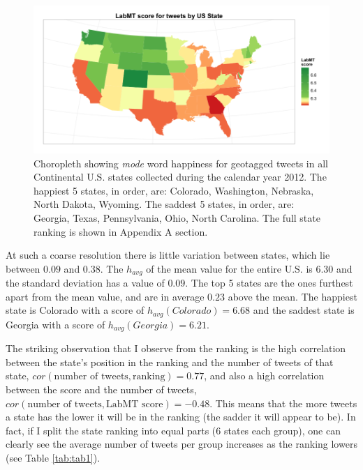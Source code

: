 \documentclass{llncs}
\begin{document}
\begin{figure}
\centering
\includegraphics[width=\textwidth]{images/scores_by_state}
\caption{Choropleth showing \emph{mode} word happiness for geotagged tweets in all Continental U.S. states collected during the calendar year 2012. The happiest 5 states, in order, are: Colorado, Washington, Nebraska, North Dakota, Wyoming. The saddest 5 states, in order, are: Georgia, Texas, Pennsylvania, Ohio, North Carolina. The full state ranking is shown in Appendix A section.}
\label{fig:scores_by_state}
\end{figure}
\FloatBarrier

At such a coarse resolution there is little variation between states, which lie between $0.09$ and $0.38$. The $h_{avg}$ of the mean value for the entire U.S. is $6.30$ and the standard deviation has a value of $0.09$. The top 5 states are the ones furthest apart from the mean value, and are in average $0.23$ above the mean. The happiest state is Colorado with a score of $h_{avg}(Colorado) = 6.68$ and the saddest state is Georgia with a score of $h_{avg}(Georgia) = 6.21$.

The striking observation that I observe from the ranking is the high correlation between the state's position in the ranking and the number of tweets of that state, $cor(\textrm{number of tweets}, \textrm{ranking}) = 0.77$, and also a high correlation between the score and the number of tweets, $cor(\textrm{number of tweets}, \textrm{LabMT score}) = -0.48$. This means that the more tweets a state has the lower it will be in the ranking (the sadder it will appear to be). In fact, if I split the state ranking into equal parts (6 states each group), one can clearly see the average number of tweets per group increases as the ranking lowers (see Table \ref{tab:tab1}).
\end{document}
